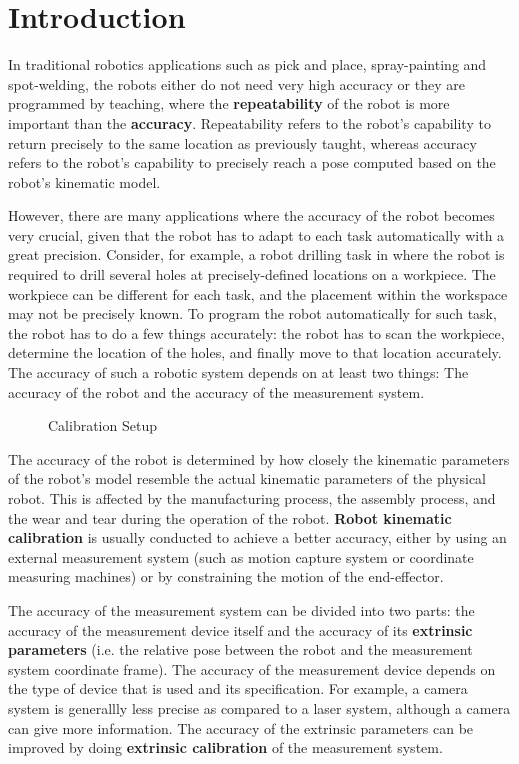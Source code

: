 \section{Introduction}
\label{sec:introduction}

In traditional robotics applications such as pick and place, spray-painting and spot-welding, the robots either do not need very high accuracy or they are programmed by teaching, where the \textbf{repeatability} of the robot is more important than the \textbf{accuracy}. Repeatability refers to the robot's capability to return precisely to the same location as previously taught, whereas accuracy refers to the robot's capability to precisely reach a pose computed based on the robot's kinematic model. 

However, there are many applications where the accuracy of the robot becomes very crucial, given that the robot has to adapt to each task automatically with a great precision. Consider, for example, a robot drilling task in \cite{Suarez-Ruiz2018} where the robot is required to drill several holes at precisely-defined locations on a workpiece. The workpiece can be different for each task, and the placement within the workspace may not be precisely known. To program the robot automatically for such task, the robot has to do a few things accurately: the robot has to scan the workpiece, determine the location of the holes, and finally move to that location accurately. The accuracy of such a robotic system depends on at least two things: The accuracy of the robot and the accuracy of the measurement system. 
\begin{figure}[t]
  \centering
  \caption{Calibration Setup}
  \label{fig:robot_setup}
\end{figure}

The accuracy of the robot is determined by how closely the kinematic parameters of the robot's model resemble the actual kinematic parameters of the physical robot. This is affected by the manufacturing process, the assembly process, and the wear and tear during the operation of the robot. \textbf{Robot kinematic calibration} is usually conducted to achieve a better accuracy, either by using an external measurement system (such as motion capture system or coordinate measuring machines) or by constraining the motion of the end-effector.

The accuracy of the measurement system can be divided into two parts: the accuracy of the measurement device itself and the accuracy of its \textbf{extrinsic parameters} (i.e. the relative pose between the robot and the measurement system coordinate frame). The accuracy of the measurement device depends on the type of device that is used and its specification. For example, a camera system is generallly less precise as compared to a laser system, although a camera can give more information. The accuracy of the extrinsic parameters can be improved by doing \textbf{extrinsic calibration} of the measurement system.  

